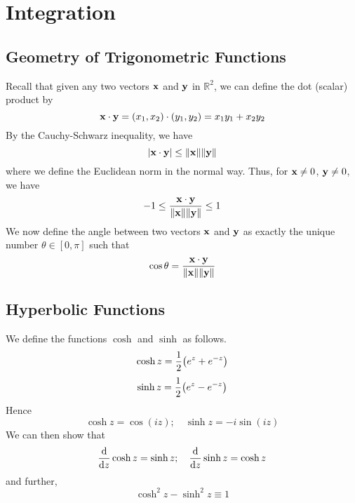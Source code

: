 \documentclass{article}
\begin{document}
\section{Integration}
\subsection{Geometry of Trigonometric Functions}
Recall that given any two vectors $\vb x$ and $\vb y$ in $\mathbb R^2$, we can define the dot (scalar) product by
\[ \vb x \cdot \vb y = (x_1, x_2) \cdot (y_1, y_2) = x_1y_1 + x_2y_2 \]
By the Cauchy-Schwarz inequality, we have
\[ \abs{\vb x \cdot \vb y} \leq \norm{\vb x} \norm{\vb y} \]
where we define the Euclidean norm in the normal way. Thus, for $\vb x \neq 0$, $\vb y \neq 0$, we have
\[ -1 \leq \frac{\vb x \cdot \vb y}{\norm{\vb x} \norm{\vb y}} \leq 1 \]
We now define the angle between two vectors $\vb x$ and $\vb y$ as exactly the unique number $\theta \in [0, \pi]$ such that
\[ \cos\theta = \frac{\vb x \cdot \vb y}{\norm{\vb x} \norm{\vb y}} \]

\subsection{Hyperbolic Functions}
We define the functions $\cosh$ and $\sinh$ as follows.
\[ \cosh z = \frac{1}{2}\qty(e^z + e^{-z}) \]
\[ \sinh z = \frac{1}{2}\qty(e^z - e^{-z}) \]
Hence
\[ \cosh z = \cos(iz);\quad \sinh z = -i\sin(iz) \]
We can then show that
\[ \dv{z} \cosh z = \sinh z;\quad \dv{z} \sinh z = \cosh z \]
and further,
\[ \cosh^2 z - \sinh^2 z \equiv 1 \]
\end{document}
